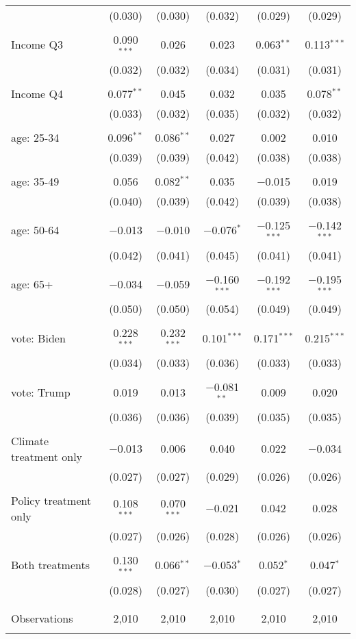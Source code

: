 \begin{tabular}{@{\extracolsep{5pt}}lccccc}
  & (0.030) & (0.030) & (0.032) & (0.029) & (0.029) \\ 
  & & & & & \\ 
 Income Q3 & 0.090$^{***}$ & 0.026 & 0.023 & 0.063$^{**}$ & 0.113$^{***}$ \\ 
  & (0.032) & (0.032) & (0.034) & (0.031) & (0.031) \\ 
  & & & & & \\ 
 Income Q4 & 0.077$^{**}$ & 0.045 & 0.032 & 0.035 & 0.078$^{**}$ \\ 
  & (0.033) & (0.032) & (0.035) & (0.032) & (0.032) \\ 
  & & & & & \\ 
 age: 25-34 & 0.096$^{**}$ & 0.086$^{**}$ & 0.027 & 0.002 & 0.010 \\ 
  & (0.039) & (0.039) & (0.042) & (0.038) & (0.038) \\ 
  & & & & & \\ 
 age: 35-49 & 0.056 & 0.082$^{**}$ & 0.035 & $-$0.015 & 0.019 \\ 
  & (0.040) & (0.039) & (0.042) & (0.039) & (0.038) \\ 
  & & & & & \\ 
 age: 50-64 & $-$0.013 & $-$0.010 & $-$0.076$^{*}$ & $-$0.125$^{***}$ & $-$0.142$^{***}$ \\ 
  & (0.042) & (0.041) & (0.045) & (0.041) & (0.041) \\ 
  & & & & & \\ 
 age: 65+ & $-$0.034 & $-$0.059 & $-$0.160$^{***}$ & $-$0.192$^{***}$ & $-$0.195$^{***}$ \\ 
  & (0.050) & (0.050) & (0.054) & (0.049) & (0.049) \\ 
  & & & & & \\ 
 vote: Biden & 0.228$^{***}$ & 0.232$^{***}$ & 0.101$^{***}$ & 0.171$^{***}$ & 0.215$^{***}$ \\ 
  & (0.034) & (0.033) & (0.036) & (0.033) & (0.033) \\ 
  & & & & & \\ 
 vote: Trump & 0.019 & 0.013 & $-$0.081$^{**}$ & 0.009 & 0.020 \\ 
  & (0.036) & (0.036) & (0.039) & (0.035) & (0.035) \\ 
  & & & & & \\ 
 Climate treatment only & $-$0.013 & 0.006 & 0.040 & 0.022 & $-$0.034 \\ 
  & (0.027) & (0.027) & (0.029) & (0.026) & (0.026) \\ 
  & & & & & \\ 
 Policy treatment only & 0.108$^{***}$ & 0.070$^{***}$ & $-$0.021 & 0.042 & 0.028 \\ 
  & (0.027) & (0.026) & (0.028) & (0.026) & (0.026) \\ 
  & & & & & \\ 
 Both treatments & 0.130$^{***}$ & 0.066$^{**}$ & $-$0.053$^{*}$ & 0.052$^{*}$ & 0.047$^{*}$ \\ 
  & (0.028) & (0.027) & (0.030) & (0.027) & (0.027) \\ 
  & & & & & \\ 
\hline \\[-1.8ex] 

Observations & 2,010 & 2,010 & 2,010 & 2,010 & 2,010 \\ 
\hline 
\hline \\[-1.8ex] 
\end{tabular} 